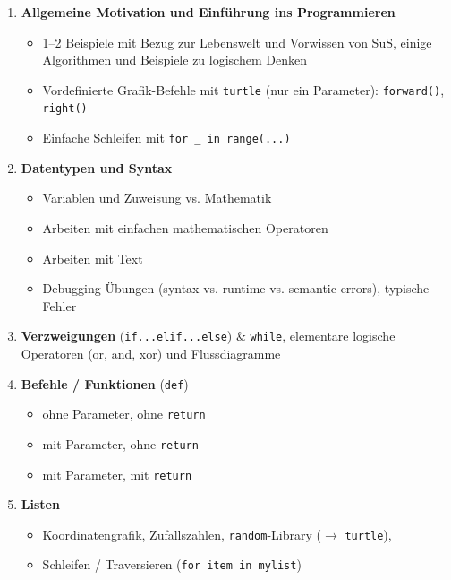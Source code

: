 \begin{myoverview}
	\leavevmode
	\begin{enumerate}
		\item \textbf{Allgemeine Motivation und Einführung ins Programmieren}
		      \begin{itemize}
			      \item 1--2 Beispiele mit Bezug zur Lebenswelt und Vorwissen von SuS, einige Algorithmen und Beispiele zu logischem Denken
			      \item Vordefinierte Grafik-Befehle mit \lstinline|turtle| (nur ein Parameter): \lstinline|forward()|, \lstinline|right()|
			      \item Einfache Schleifen mit \lstinline|for _ in range(...)|
		      \end{itemize}
		\item \textbf{Datentypen und Syntax}
		      \begin{itemize}
			      \item Variablen und Zuweisung vs. Mathematik
			      \item Arbeiten mit einfachen mathematischen Operatoren
			      \item Arbeiten mit Text
			      \item Debugging-Übungen (syntax vs. runtime vs. semantic errors), typische Fehler
		      \end{itemize}
		\item \textbf{Verzweigungen} (\lstinline|if...elif...else|) \& \lstinline|while|,  elementare logische Operatoren (or, and, xor)  und Flussdiagramme
		\item \textbf{Befehle / Funktionen} (\lstinline|def|)
		      \begin{itemize}
			      \item ohne Parameter, ohne \lstinline|return|
			      \item mit Parameter, ohne \lstinline|return|
			      \item mit Parameter, mit \lstinline|return|
		      \end{itemize}
		\item \textbf{Listen}
		      \begin{itemize}
			      \item  Koordinatengrafik, Zufallszahlen, \lstinline|random|-Library ($\rightarrow$ \lstinline|turtle|), \item Schleifen / Traversieren (\lstinline|for item in mylist|)
		      \end{itemize}
	\end{enumerate}
\end{myoverview}


